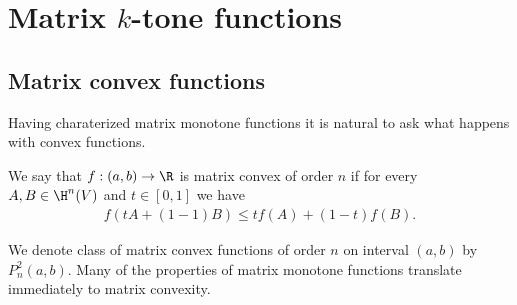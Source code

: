 \chapter{Matrix $k$-tone functions}

\section{Matrix convex functions}

Having charaterized matrix monotone functions it is natural to ask what happens with convex functions.

\begin{maar}
	We say that $f : (a, b) \to \R$ is matrix convex of order $n$ if for every $A, B \in \H^{n}(V)$ and $t \in [0, 1]$ we have
	\begin{align*}
		f(t A + (1 - 1) B) \leq t f(A) + (1 - t) f(B).
	\end{align*}
\end{maar}

We denote class of matrix convex functions of order $n$ on interval $(a, b)$ by $P^{2}_{n}(a, b)$. Many of the properties of matrix monotone functions translate immediately to matrix convexity.

